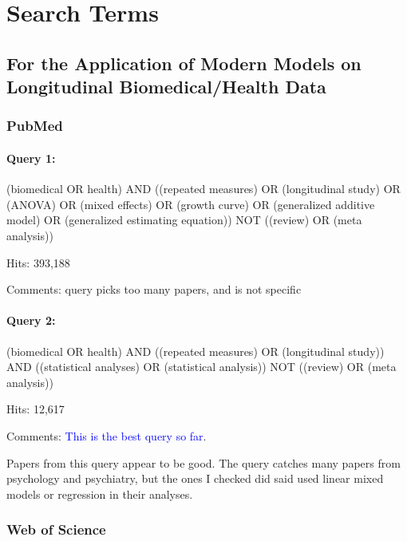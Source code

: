 \documentclass[
]{article}
\let\oldparagraph\paragraph
\renewcommand{\paragraph}[1]{\oldparagraph{#1}\mbox{}}
\begin{document}
\hypertarget{search-terms}{%
\section{Search Terms}\label{search-terms}}

\hypertarget{for-the-application-of-modern-models-on-longitudinal-biomedicalhealth-data}{%
\subsection{For the Application of Modern Models on Longitudinal
Biomedical/Health
Data}\label{for-the-application-of-modern-models-on-longitudinal-biomedicalhealth-data}}

\hypertarget{pubmed}{%
\subsubsection{PubMed}\label{pubmed}}

\hypertarget{query-1}{%
\paragraph{Query 1:}\label{query-1}}

(biomedical OR health) AND ((repeated measures) OR (longitudinal study)
OR (ANOVA) OR (mixed effects) OR (growth curve) OR (generalized additive
model) OR (generalized estimating equation)) NOT ((review) OR (meta
analysis))

Hits: 393,188

Comments: query picks too many papers, and is not specific

\hypertarget{query-2}{%
\paragraph{Query 2:}\label{query-2}}

(biomedical OR health) AND ((repeated measures) OR (longitudinal study))
AND ((statistical analyses) OR (statistical analysis)) NOT ((review) OR
(meta analysis))

Hits: 12,617

Comments: \textcolor{blue}{This is the best query so far}.

Papers from this query appear to be good. The query catches many papers
from psychology and psychiatry, but the ones I checked did said used
linear mixed models or regression in their analyses.

\hypertarget{web-of-science}{%
\subsubsection{Web of Science}\label{web-of-science}}
\end{document}
